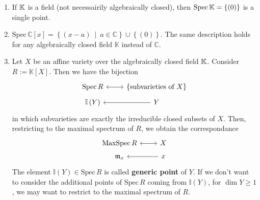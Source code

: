 \begin{ex}\leavevmode\vspace{-.2\baselineskip}
\begin{enumerate}
\item If $\mathbb{K}$ is a field (not necessairily algebraically closed),
	then $\mathrm{Spec}\, \mathbb{K} = \left\{ (0) \right\}$ is a single point.
\item $\mathrm{Spec}\, \mathbb{C}[x] = \left\{ (x-a) \ \middle|\ a \in \mathbb{C} \right\} \cup \left\{ (0) \right\}$.
	The same description holds for any algebraically closed field $\mathbb{K}$ instead of $\mathbb{C}$.
\item Let $X$ be an affine variety over the algebraically closed field $\mathbb{K}$.
	Consider $R := \mathbb{K}[X]$. Then we have the bijection
	\begin{equation}
	\begin{tikzcd}[row sep=tiny]
		\mathrm{Spec}\, R \arrow[r, "", leftrightarrow] &
		\left\{ \text{subvarieties of } X \right\}\\
		\mathbb{I}\left( Y \right) &
		Y \arrow[l, "", rightarrow] 
	\end{tikzcd}
	\end{equation} 
	in which subvarieties are exactly the irreducible closed subsets of $X$.
	Then, restricting to the maximal spectrum of $R$, we obtain the correspondance
	\begin{equation}
	\begin{tikzcd}[row sep=tiny]
		\mathrm{MaxSpec}\, R \arrow[r, "", leftrightarrow] &
		X\\
		\mathfrak{m}_x &
		x \arrow[l, "", rightarrow] 
	\end{tikzcd}
	\end{equation} 
	The element $\mathbb{I}\left( Y \right) \in \mathrm{Spec}\, R$ is called
	\textbf{generic point} of $Y$.
	If we don't want to consider the additional points of $\mathrm{Spec}\, R$ coming
	from $\mathbb{I}\left( Y \right)$, for $\dim Y \geq 1$,
	we may want to restrict to the maximal spectrum of $R$.


\end{enumerate}
\end{ex}
